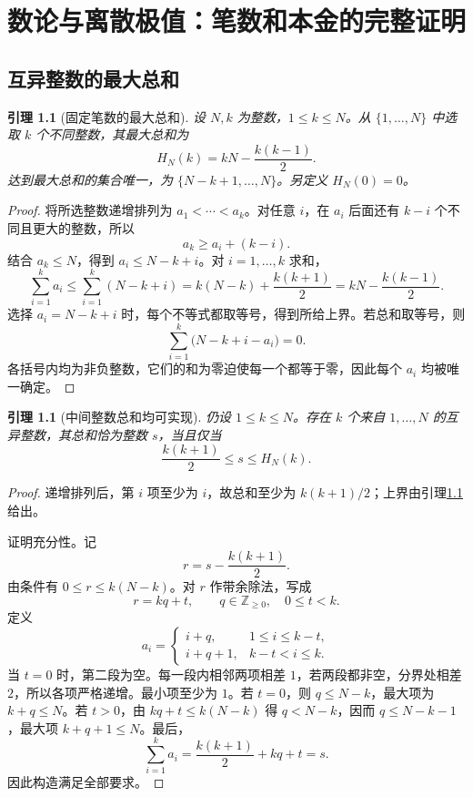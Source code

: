 \documentclass[UTF8,a4paper]{ctexbook}
\newtheorem{lemma}[theorem]{引理}
\theoremstyle{definition}
\numberwithin{equation}{chapter}
\newcommand{\Z}{\mathbb{Z}}
\newcommand{\1}{\mathbf{1}}
\begin{document}
\chapter{数论与离散极值：笔数和本金的完整证明}\label{int:chapter}

\section{互异整数的最大总和}
\begin{lemma}[固定笔数的最大总和]\label{int:maxsum}
设 $N,k$ 为整数，$1\le k\le N$。从 $\{1,\ldots,N\}$ 中选取 $k$ 个不同整数，其最大总和为
\begin{equation}\label{int:H}
H_N(k)=kN-\frac{k(k-1)}2.
\end{equation}
达到最大总和的集合唯一，为 $\{N-k+1,\ldots,N\}$。另定义 $H_N(0)=0$。
\end{lemma}
\begin{proof}
将所选整数递增排列为 $a_1<\cdots<a_k$。对任意 $i$，在 $a_i$ 后面还有 $k-i$ 个不同且更大的整数，所以
\[
a_k\ge a_i+(k-i).
\]
结合 $a_k\le N$，得到 $a_i\le N-k+i$。对 $i=1,\ldots,k$ 求和，
\[
\sum_{i=1}^{k}a_i\le\sum_{i=1}^{k}(N-k+i)
=k(N-k)+\frac{k(k+1)}2
=kN-\frac{k(k-1)}2.
\]
选择 $a_i=N-k+i$ 时，每个不等式都取等号，得到所给上界。若总和取等号，则
\[
\sum_{i=1}^{k}\bigl(N-k+i-a_i\bigr)=0.
\]
各括号内均为非负整数，它们的和为零迫使每一个都等于零，因此每个 $a_i$ 均被唯一确定。
\end{proof}

\begin{lemma}[中间整数总和均可实现]\label{int:interval}
仍设 $1\le k\le N$。存在 $k$ 个来自 $1,\ldots,N$ 的互异整数，其总和恰为整数 $s$，当且仅当
\begin{equation}\label{int:interval-range}
\frac{k(k+1)}2\le s\le H_N(k).
\end{equation}
\end{lemma}
\begin{proof}
递增排列后，第 $i$ 项至少为 $i$，故总和至少为 $k(k+1)/2$；上界由引理\ref{int:maxsum}给出。

证明充分性。记
\[
r=s-\frac{k(k+1)}2.
\]
由条件有 $0\le r\le k(N-k)$。对 $r$ 作带余除法，写成
\[
r=kq+t,\qquad q\in\Z_{\ge0},\quad 0\le t<k.
\]
定义
\[
a_i=\begin{cases}
i+q,&1\le i\le k-t,\\
i+q+1,&k-t<i\le k.
\end{cases}
\]
当 $t=0$ 时，第二段为空。每一段内相邻两项相差 $1$，若两段都非空，分界处相差 $2$，所以各项严格递增。最小项至少为 $1$。若 $t=0$，则 $q\le N-k$，最大项为 $k+q\le N$。若 $t>0$，由 $kq+t\le k(N-k)$ 得 $q<N-k$，因而 $q\le N-k-1$，最大项 $k+q+1\le N$。最后，
\[
\sum_{i=1}^{k}a_i=\frac{k(k+1)}2+kq+t=s.
\]
因此构造满足全部要求。
\end{proof}
\end{document}
